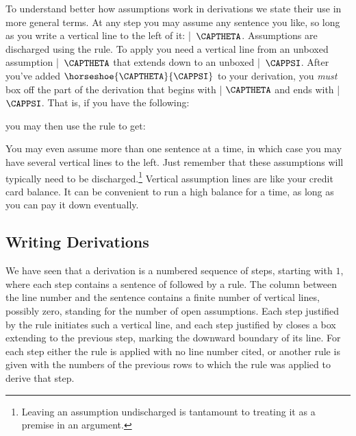 To understand better how assumptions work in derivations we state their use in more general terms.
At any step you may assume any sentence you like, so long as you write a vertical line to the left of it: \mbox{| $\CAPTHETA$}.
Assumptions are discharged using the  rule.
To apply  you need a vertical line from an unboxed assumption \mbox{| $\CAPTHETA$} that extends down to an unboxed \mbox{| $\CAPPSI$}. 
After you've added $\horseshoe{\CAPTHETA}{\CAPPSI}$ to your derivation, you \emph{must} box off the part of the derivation that begins with | $\CAPTHETA$ and ends with | $\CAPPSI$.
That is, if you have the following:

\begin{gproofnn}[\label{conditionalintro}]
\end{gproofnn}

\noindent{}you may then use the rule  to get:

\begin{gproofnn}[\label{conditionalintroclosed}]
\end{gproofnn}

\noindent{}You may even assume more than one sentence at a time, in which case you may have several vertical lines to the left.
Just remember that these assumptions will typically need to be discharged.\footnote{Leaving an assumption undischarged is tantamount to treating it as a premise in an argument.}
Vertical assumption lines are like your credit card balance.
It can be convenient to run a high balance for a time, as long as you can pay it down eventually.

\subsection{Writing Derivations}

We have seen that a \GSD{} derivation is a numbered sequence of steps, starting with $1$, where each step contains a sentence of \GSL{} followed by a \GSD{} rule.
The column between the line number and the sentence contains a finite number of vertical lines, possibly zero, standing for the number of open assumptions.
Each step justified by the rule  initiates such a vertical line, and each step justified by  closes a box extending to the previous  step, marking the downward boundary of its line.
For each step either the  rule is applied with no line number cited, or another rule is given with the numbers of the previous rows to which the rule was applied to derive that step. 

